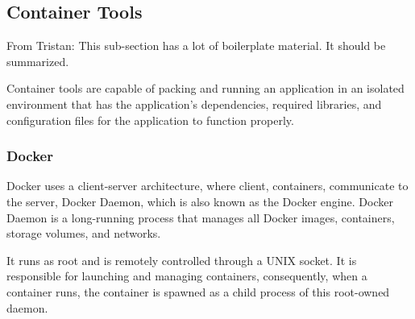 \documentclass[a4paper,num-refs]{oup-contemporary}
\newcommand{\tristan}[1]{\color{blue}From Tristan: #1\color{black}}
\begin{document}

\subsection{Container Tools}

\tristan{This sub-section has a lot of boilerplate material. It should be summarized.}

Container tools are capable of packing and running an application in an isolated environment that has
the application's dependencies,
required libraries, and configuration files for the
application to function properly.

\subsubsection{Docker}

Docker uses a client-server architecture, where client, containers, communicate to
the server, Docker Daemon, which is also known as the Docker engine.
Docker Daemon is a long-running process that manages all Docker images, containers, storage volumes, and networks.

%
%
%
It runs as root and is remotely controlled through a
UNIX socket. It is responsible for launching and managing containers,
consequently, when a container runs, the container is spawned as a
child process of this root-owned daemon.
\end{document}
